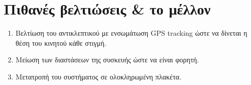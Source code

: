 \section{Πιθανές βελτιώσεις \& το μέλλον}
\begin{enumerate}
\item Βελτίωση του αντικλεπτικού με ενσωμάτωση GPS tracking ώστε να δίνεται η θέση του κινητού κάθε στιγμή.
\item Μείωση των διαστάσεων της συσκευής ώστε να είναι φορητή.
\item Μετατροπή του συστήματος σε ολοκληρωμένη πλακέτα.
\end{enumerate}
